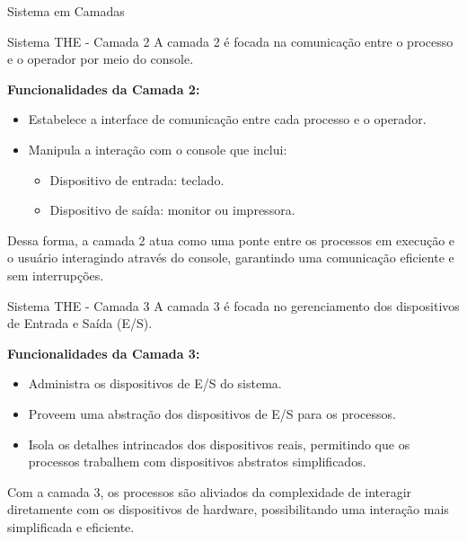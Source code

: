 \documentclass{beamer}
\begin{document}
\begin{frame}{Sistema em Camadas}
\begin{frame}{Sistema THE -  Camada 2}
    A camada 2 é focada na comunicação entre o processo e o operador por meio do console.

    \vspace{0.5cm}

    \textbf{Funcionalidades da Camada 2:}
    \begin{itemize}
        \item Estabelece a interface de comunicação entre cada processo e o operador.
        \item Manipula a interação com o console que inclui:
              \begin{itemize}
                  \item Dispositivo de entrada: teclado.
                  \item Dispositivo de saída: monitor ou impressora.
              \end{itemize}
    \end{itemize}

    \vspace{0.5cm}

    Dessa forma, a camada 2 atua como uma ponte entre os processos em execução e o usuário interagindo através do console, garantindo uma comunicação eficiente e sem interrupções.
\end{frame}

\begin{frame}{Sistema THE -  Camada 3}
    A camada 3 é focada no gerenciamento dos dispositivos de Entrada e Saída (E/S).

    \vspace{0.5cm}

    \textbf{Funcionalidades da Camada 3:}
    \begin{itemize}
        \item Administra os dispositivos de E/S do sistema.
        \item Proveem uma abstração dos dispositivos de E/S para os processos.
        \item Isola os detalhes intrincados dos dispositivos reais, permitindo que os processos trabalhem com dispositivos abstratos simplificados.
    \end{itemize}

    \vspace{0.5cm}

    Com a camada 3, os processos são aliviados da complexidade de interagir diretamente com os dispositivos de hardware, possibilitando uma interação mais simplificada e eficiente.
\end{frame}


\end{frame}
\end{document}
